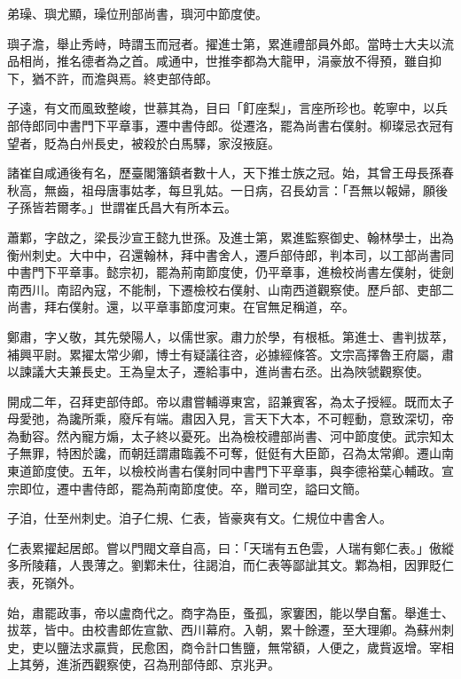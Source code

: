 \begin{pinyinscope}
 弟璪、璵尤顯，璪位刑部尚書，璵河中節度使。



 璵子澹，舉止秀峙，時謂玉而冠者。擢進士第，累進禮部員外郎。當時士大夫以流品相尚，推名德者為之首。咸通中，世推李都為大龍甲，涓豪放不得預，雖自抑下，猶不許，而澹與焉。終吏部侍郎。



 子遠，有文而風致整峻，世慕其為，目曰「飣座梨」，言座所珍也。乾寧中，以兵部侍郎同中書門下平章事，遷中書侍郎。從遷洛，罷為尚書右僕射。柳璨忌衣冠有望者，貶為白州長史，被殺於白馬驛，家沒掖庭。



 諸崔自咸通後有名，歷臺閣籓鎮者數十人，天下推士族之冠。始，其曾王母長孫春秋高，無齒，祖母唐事姑孝，每旦乳姑。一日病，召長幼言：「吾無以報婦，願後子孫皆若爾孝。」世謂崔氏昌大有所本云。



 蕭鄴，字啟之，梁長沙宣王懿九世孫。及進士第，累進監察御史、翰林學士，出為衡州刺史。大中中，召還翰林，拜中書舍人，遷戶部侍郎，判本司，以工部尚書同中書門下平章事。懿宗初，罷為荊南節度使，仍平章事，進檢校尚書左僕射，徙劍南西川。南詔內寇，不能制，下遷檢校右僕射、山南西道觀察使。歷戶部、吏部二尚書，拜右僕射。還，以平章事節度河東。在官無足稱道，卒。



 鄭肅，字乂敬，其先滎陽人，以儒世家。肅力於學，有根柢。第進士、書判拔萃，補興平尉。累擢太常少卿，博士有疑議往咨，必據經條答。文宗高擇魯王府屬，肅以諫議大夫兼長史。王為皇太子，遷給事中，進尚書右丞。出為陜虢觀察使。



 開成二年，召拜吏部侍郎。帝以肅嘗輔導東宮，詔兼賓客，為太子授經。既而太子母愛弛，為讒所乘，廢斥有端。肅因入見，言天下大本，不可輕動，意致深切，帝為動容。然內寵方煽，太子終以憂死。出為檢校禮部尚書、河中節度使。武宗知太子無罪，特困於讒，而朝廷謂肅臨義不可奪，侹侹有大臣節，召為太常卿。遷山南東道節度使。五年，以檢校尚書右僕射同中書門下平章事，與李德裕葉心輔政。宣宗即位，遷中書侍郎，罷為荊南節度使。卒，贈司空，謚曰文簡。



 子洎，仕至州刺史。洎子仁規、仁表，皆豪爽有文。仁規位中書舍人。



 仁表累擢起居郎。嘗以門閥文章自高，曰：「天瑞有五色雲，人瑞有鄭仁表。」傲縱多所陵藉，人畏薄之。劉鄴未仕，往謁洎，而仁表等鄙訿其文。鄴為相，因罪貶仁表，死嶺外。



 始，肅罷政事，帝以盧商代之。商字為臣，蚤孤，家窶困，能以學自奮。舉進士、拔萃，皆中。由校書郎佐宣歙、西川幕府。入朝，累十餘遷，至大理卿。為蘇州刺史，吏以鹽法求贏貲，民愈困，商令計口售鹽，無常額，人便之，歲貲返增。宰相上其勞，進浙西觀察使，召為刑部侍郎、京兆尹。




\end{pinyinscope}
